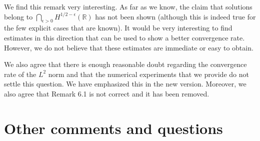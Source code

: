 \documentclass[11 pt]{article}
\numberwithin{equation}{section}
\begin{document}
\begin{enumerate}
We find this remark very interesting. As far as we know, the claim that solutions belong to \(\bigcap_{\epsilon>0}H^{1/2-\epsilon}(\mathbb{R})\) has not been shown (although this is indeed true for the few explicit cases that are known). It would be very interesting to find estimates in this direction that can be used to show a better convergence rate. However, we do not believe that these estimates are immediate or easy to obtain.

We also agree that there is enough reasonable doubt regarding the convergence rate of the $L^2$ norm and that the numerical experiments that we provide do not settle this question. We have emphasized this in the new version. Moreover, we also agree that Remark 6.1 is not correct and it has been removed.

\end{enumerate}

\section*{Other comments and questions}
\end{document}
